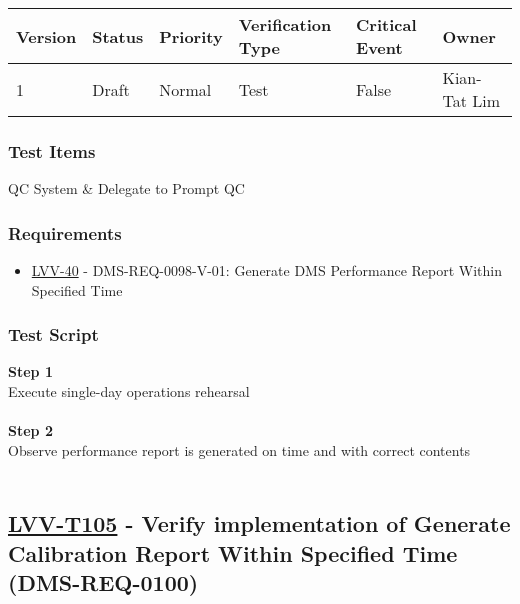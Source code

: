 \begin{longtable}[]{@{}llllll@{}}
\toprule
Version & Status & Priority & Verification Type & Critical Event &
Owner\tabularnewline
\midrule
\endhead
1 & Draft & Normal & Test & False & Kian-Tat Lim\tabularnewline
\bottomrule
\end{longtable}

\hypertarget{test-items-80}{%
\subsubsection{Test Items}\label{test-items-80}}

QC System \& Delegate to Prompt QC

\hypertarget{requirements-81}{%
\subsubsection{Requirements}\label{requirements-81}}

\begin{itemize}
\tightlist
\item
  \href{https://jira.lsstcorp.org/browse/LVV-40}{LVV-40} -
  DMS-REQ-0098-V-01: Generate DMS Performance Report Within Specified
  Time
\end{itemize}

\hypertarget{test-script-81}{%
\subsubsection{Test Script}\label{test-script-81}}

\textbf{Step 1}\\
Execute single-day operations rehearsal\\
~\\
\textbf{Step 2}\\
Observe performance report is generated on time and with correct
contents\\
~\\

\hypertarget{lvv-t105---verify-implementation-of-generate-calibration-report-within-specified-time-dms-req-0100}{%
\subsection{\texorpdfstring{\href{https://jira.lsstcorp.org/secure/Tests.jspa\#/testCase/LVV-T105}{LVV-T105}
- Verify implementation of Generate Calibration Report Within Specified
Time
(DMS-REQ-0100)}{LVV-T105 - Verify implementation of Generate Calibration Report Within Specified Time (DMS-REQ-0100)}}\label{lvv-t105---verify-implementation-of-generate-calibration-report-within-specified-time-dms-req-0100}}

